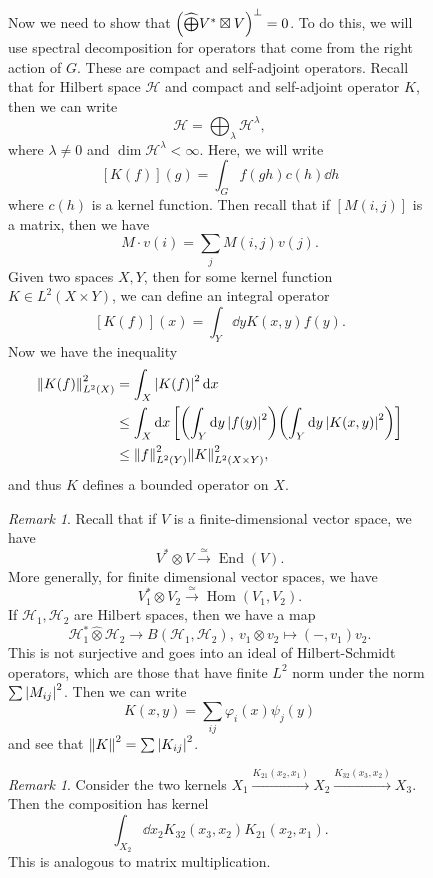 \documentclass[leqno, openany]{memoir}
\theoremstyle{definition}
\theoremstyle{remark}
\newtheorem{rmk}[thm]{Remark}
\theoremstyle{plain}
\theoremstyle{definition}
\theoremstyle{remark}
\newcommand{\mc}[1]{\mathcal{#1}}
\newcommand{\wh}[1]{\widehat{#1}}
\DeclareMathOperator{\Hom}{Hom}
\DeclareMathOperator{\End}{End}
\begin{document}
\begin{figure}[H]
Now we need to show that $\qty( \wh{\bigoplus} V^* \boxtimes V )^{\perp} = 0$.
To do this, we will use spectral decomposition for operators that come from the
right action of $G$. These are compact and self-adjoint operators. Recall that
for Hilbert space $\mc{H}$ and compact and self-adjoint operator $K$, then we
can write \[ \mc{H} = \bigoplus_{\lambda} \mc{H}^{\lambda}, \] where $\lambda
\neq 0$ and $\dim \mc{H}^{\lambda} < \infty$. Here, we will write \[ [K(f)](g)
= \int_G f(gh) c(h) \dd{h} \] where $c(h)$ is a kernel function. Then recall
that if $[M(i,j)]$ is a matrix, then we have \[ M \cdot v(i) = \sum_j M(i,j)
    v(j). \] Given two spaces $X,Y$, then for some kernel function $K \in L^2(X
    \times Y)$, we can define an integral operator \[ [K(f)](x) = \int_Y \dd{y}
    K(x,y) f(y). \] Now we have the inequality \begin{align*}
    \norm{K(f)}^2_{L^2(X)} &= \int_X \abs{K(f)}^2 \dd{x} \\ &\leq \int_X \dd{x}
    \qty[ \qty(\int_Y \dd{y} \abs{f(y)}^2) \qty(\int_Y \dd{y} \abs{K(x,y)}^2) ]
                        \\ &\leq \norm{f}^2_{L^2(Y)} \norm{K}^2_{L^2(X \times
                        Y)}, \end{align*} and thus $K$ defines a bounded
                        operator on $X$.

\begin{rmk} Recall that if $V$ is a finite-dimensional vector space, we have \[
    V^* \otimes V \xrightarrow{\simeq} \End(V). \] More generally, for finite
    dimensional vector spaces, we have \[ V_1^* \otimes V_2
    \xrightarrow{\simeq} \Hom(V_1, V_2). \] If $\mc{H}_1, \mc{H}_2$ are Hilbert
    spaces, then we have a map \[ \mc{H}_1^* \wh{\otimes} \mc{H}_2 \to
    B(\mc{H}_1, \mc{H}_2),\ v_1 \otimes v_2 \mapsto (-,v_1)v_2. \] This is not
    surjective and goes into an ideal of Hilbert-Schmidt operators, which are
    those that have finite $L^2$ norm under the norm $\sum \abs{M_{ij}}^2$.
    Then we can write \[ K(x,y) = \sum_{ij} \varphi_i(x) \psi_j(y) \] and see
that $\norm{K}^2 = \sum \abs{K_{ij}}^2$.  \end{rmk}

\begin{rmk} Consider the two kernels $X_1 \xrightarrow{K_{21}(x_2, x_1)} X_2
    \xrightarrow{K_{32}(x_3, x_2)} X_3$. Then the composition has kernel \[
    \int_{X_2} \dd{x_2} K_{32}(x_3, x_2) K_{21}(x_2, x_1). \] This is analogous
    to matrix multiplication.  \end{rmk}


\end{figure}
\end{document}
